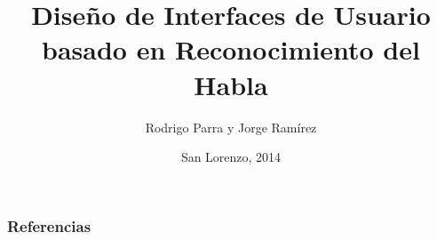\documentclass[compress]{beamer}
\title{Dise\~no de Interfaces de Usuario basado en Reconocimiento del Habla}
\author{Rodrigo Parra y Jorge Ram\'{i}rez}
\date{San Lorenzo, 2014}
\begin{document}
\frame{\titlepage}

\frame{\tableofcontents}

\justifying












\begin{frame}[allowframebreaks]
\frametitle{Referencias}
\printbibliography
\end{frame}
\end{document}

